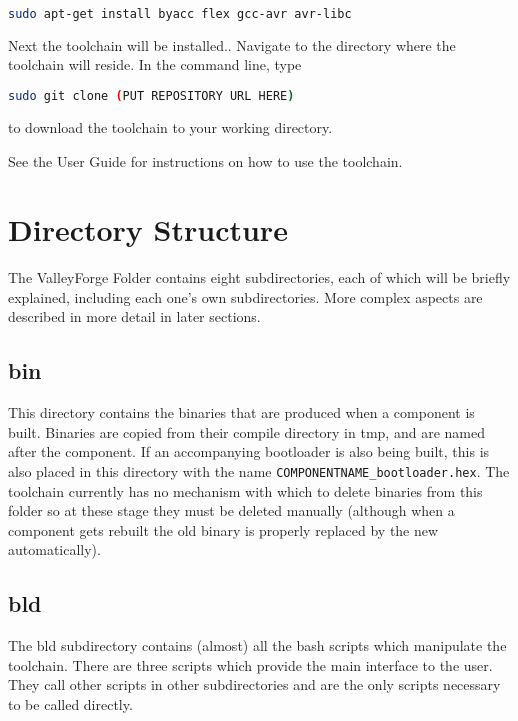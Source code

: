 \documentclass[a4paper, oneside, 11pt, titlepage, onecolumn, openright]{report}
\begin{document}
\begin{lstlisting}[frame=trBL, breaklines=true, language = bash]
sudo apt-get install byacc flex gcc-avr avr-libc
\end{lstlisting}


Next the toolchain will be installed.. Navigate to the directory where the toolchain will reside. 
In the command line, type \newline

\begin{lstlisting}[frame=trBL, breaklines=true, language = bash]
sudo git clone (PUT REPOSITORY URL HERE)
\end{lstlisting}
to download the toolchain to your working directory.

See the User Guide for instructions on how to use the toolchain.
\pagebreak
\chapter{Directory Structure}
			\label{C:Directory Structure}
			
The ValleyForge Folder contains eight subdirectories, each of which will be briefly explained, including each one's own subdirectories. More complex aspects are described in more detail in later sections.

\section{bin}
			\label{s:bin}
			This directory contains the binaries that are produced when a component is built. Binaries are copied from their compile directory in tmp, and are named after the component. If an accompanying bootloader is also being built, this is also placed in this directory with the name \texttt{COMPONENTNAME\_bootloader.hex}. The toolchain currently has no mechanism with which to delete binaries from this folder so at these stage they must be deleted manually (although when a component gets rebuilt the old binary is properly replaced by the new automatically).
			
\section{bld}
			\label{s:bld}
			The bld subdirectory contains (almost) all the bash scripts which manipulate the toolchain. There are three scripts which provide the main interface to the user. They call other scripts in other subdirectories and are the only scripts necessary to be called directly.
			
\end{document}
